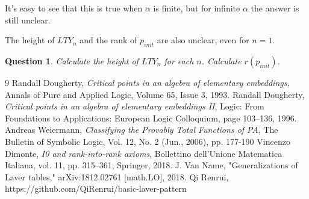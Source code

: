 \documentclass{article}
\newtheorem{question}{Question}
\theoremstyle{definition}
\theoremstyle{remark}
\begin{document}
It's easy to see that this is true when $\alpha$ is finite, but for infinite $\alpha$ the answer is still unclear.

\smallskip

The height of $LTY_n$ and the rank of $p_{init}$ are also unclear, even for $n=1$.

\begin{question}
    Calculate the height of $LTY_n$ for each $n$. Calculate $r(p_{init})$.
\end{question}

\begin{thebibliography}{9}
    Randall Dougherty, \textit{Critical points in an algebra of elementary embeddings}, Annals of Pure and Applied Logic, Volume 65, Issue 3, 1993.
    Randall Dougherty, \textit{Critical points in an algebra of elementary embeddings II}, Logic: From Foundations to Applications: European Logic Colloquium, page 103–136, 1996.
    Andreas Weiermann, \textit{Classifying the Provably Total Functions of PA}, The Bulletin of Symbolic Logic, Vol. 12, No. 2 (Jun., 2006), pp. 177-190
    Vincenzo Dimonte, \textit{I0 and rank-into-rank axioms}, Bollettino dell'Unione Matematica Italiana, vol. 11, pp. 315--361, Springer, 2018.
    J. Van Name, "Generalizations of Laver tables," arXiv:1812.02761 [math.LO], 2018.
    Qi Renrui, https://github.com/QiRenrui/basic-laver-pattern
\end{thebibliography}
\end{document}
